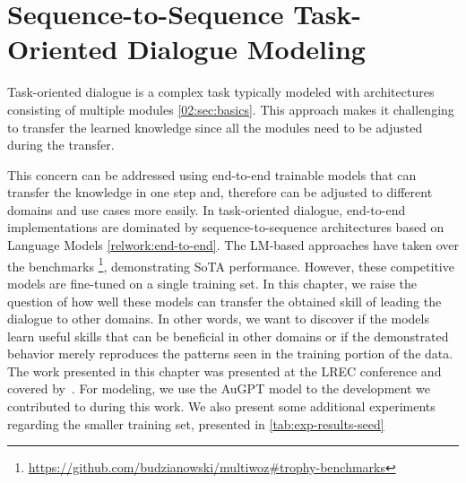 \chapter{Sequence-to-Sequence Task-Oriented Dialogue Modeling}
\label{06:chap:lm-tod}
Task-oriented dialogue is a complex task typically modeled with architectures consisting of multiple modules \ref{02:sec:basics}.
This approach makes it challenging to transfer the learned knowledge since all the modules need to be adjusted during the transfer.

This concern can be addressed using end-to-end trainable models that can transfer the knowledge in one step and, therefore can be adjusted to different domains and use cases more easily.
In task-oriented dialogue, end-to-end implementations are dominated by sequence-to-sequence architectures based on Language Models \ref{relwork:end-to-end}.
The LM-based approaches have taken over the benchmarks \footnote{\url{https://github.com/budzianowski/multiwoz\#trophy-benchmarks}}, demonstrating SoTA performance.
However, these competitive models are fine-tuned on a single training set.
In this chapter, we raise the question of how well these models can transfer the obtained skill of leading the dialogue to other domains.
In other words, we want to discover if the models learn useful skills that can be beneficial in other domains or if the demonstrated behavior merely reproduces the patterns seen in the training portion of the data.
The work presented in this chapter was presented at the LREC conference and covered by~\citet{hudecek-etal-2022-unifying}.
For modeling, we use the AuGPT model \cite{kulhanek-etal-2021-augpt} to the development we contributed to during this work.
We also present some additional experiments regarding the smaller training set, presented in \ref{tab:exp-results-seed}

